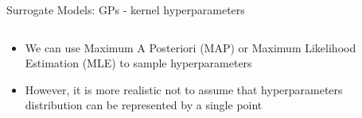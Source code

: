 \begin{frame}[c]{Surrogate Models: GPs - kernel hyperparameters}

\begin{columns}[T] %
\begin{column}{.58\textwidth}
\begin{itemize}
    \item We can use Maximum A Posteriori (MAP) or Maximum Likelihood Estimation (MLE) to sample hyperparameters \pause
    \item However, it is more realistic not to assume that hyperparameters distribution can be represented by a single point
\end{itemize}
\end{column}%

\hfill%

\begin{column}{.38\textwidth}
\end{column}%
\end{columns}

\end{frame}

